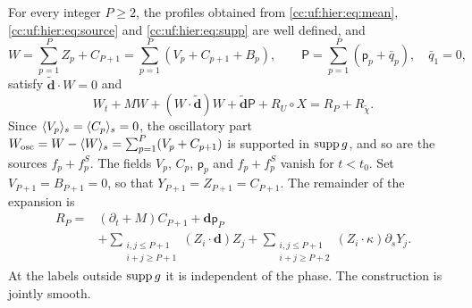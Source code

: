 \begin{proposition}\label{cc:uf:hier:prop:identity}
For every integer \(P\ge2\), the profiles obtained from
\eqref{cc:uf:hier:eq:mean}, \eqref{cc:uf:hier:eq:source} and
\eqref{cc:uf:hier:eq:supp} are well defined, and
\[
 W=\sum_{p=1}^PZ_p+C_{P+1}=\sum_{p=1}^P(V_p+C_{p+1}+B_p),\qquad
 \mathsf P=\sum_{p=1}^P(\mathsf p_p+\bar q_p),\quad \bar q_1=0,
\]
satisfy \(\widetilde {\mathbf d}\cdot W=0\) and
\begin{equation}\label{cc:uf:hier:eq:residual}
 W_t+MW+(W\cdot\widetilde {\mathbf d})W+\widetilde {\mathbf d}\mathsf P
       +R_U\circ X=R_P+R_{\widetilde\chi}.
\end{equation}
Since $\langle V_p\rangle_s=\langle C_p\rangle_s=0$, the oscillatory part
\(W_{\rm osc}=W-\langle W\rangle_s=\sum_{p=1}^P(V_p+C_{p+1})\) is
supported in \(\operatorname{supp} g\), and so are the sources $f_p+f_p^S$.
The fields $V_p$, $C_p$, $\mathsf p_p$ and $f_p+f_p^S$ vanish for
$t<t_0$.
Set \(V_{P+1}=B_{P+1}=0\), so that \(Y_{P+1}=Z_{P+1}=C_{P+1}\). The
remainder of the expansion is
\begin{align}\label{cc:uf:hier:eq:tail}
 R_P={}&(\partial_t+M)C_{P+1}+\mathbf d\mathsf p_P\\
 &+\sum_{\substack{i,j\le P+1\\i+j\ge P+1}}
                  (Z_i\cdot \mathbf d)Z_j
 +\sum_{\substack{i,j\le P+1\\i+j\ge P+2}}
                  (Z_i\cdot\kappa)\partial_sY_j.\nonumber
\end{align}
At the labels outside $\operatorname{supp} g$ it is independent of the phase.
The construction is jointly smooth.
\end{proposition}
